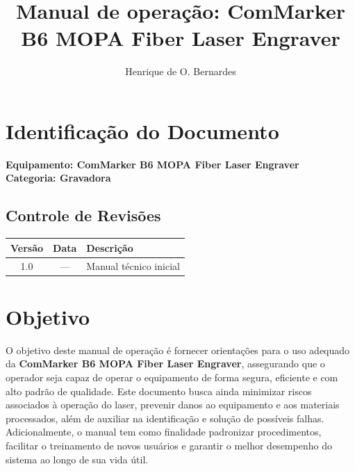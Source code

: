 \documentclass{article}
\begin{document}
\title{Manual de operação: ComMarker B6 MOPA Fiber Laser Engraver}
\author{Henrique de O. Bernardes}
\maketitle
\thispagestyle{fancy} %

\section{Identificação do Documento}
\textbf{Equipamento: ComMarker B6 MOPA Fiber Laser Engraver}\\
\textbf{Categoria: Gravadora}\\

\subsection{Controle de Revisões}
\begin{center}
\begin{tabular}{|c|c|p{8cm}|}
\hline
\textbf{Versão} & \textbf{Data} & \textbf{Descrição} \\
\hline
1.0 & --- & Manual técnico inicial \\
\hline
\end{tabular}
\end{center}
\section{Objetivo}
O objetivo deste manual de operação é fornecer orientações para o uso adequado da \textbf{ComMarker B6 MOPA Fiber Laser Engraver}, assegurando que o operador seja capaz de operar o equipamento de forma segura, eficiente e com alto padrão de qualidade. Este documento busca ainda minimizar riscos associados à operação do laser, prevenir danos ao equipamento e aos materiais processados, além de auxiliar na identificação e solução de possíveis falhas. Adicionalmente, o manual tem como finalidade padronizar procedimentos, facilitar o treinamento de novos usuários e garantir o melhor desempenho do sistema ao longo de sua vida útil.
\end{document}

